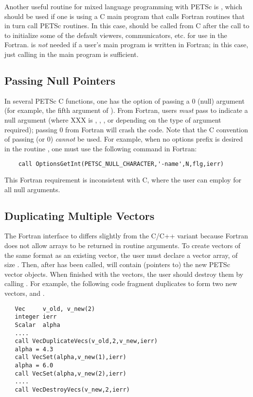 Another useful routine for mixed language programming with PETSc is
, which should be used if one is using a
C main program that calls Fortran routines that in turn call PETSc
routines.  In this case,  should be
called from C after the call to  to initialize
some of the default viewers, communicators, etc.  for use in the
Fortran.   is {\em not} needed if a
user's main program is written in Fortran; in this case, just calling
 in the main program is sufficient.

\subsection{Passing Null Pointers}

In several PETSc C functions, one has the option of passing a 0 (null)
argument (for example, the fifth argument of ).
From Fortran, users {\em must} pass  to indicate a
null argument (where XXX is , , ,
or  depending on the type of argument required); 
 passing  0 from 
 Fortran   will crash
the code.   Note
that the C convention of passing  (or 0) {\em cannot}
be used.  For example, when no options prefix is desired in the
routine , one must use the following command in
Fortran:
\begin{verbatim}
    call OptionsGetInt(PETSC_NULL_CHARACTER,'-name',N,flg,ierr)
\end{verbatim}

This Fortran requirement is inconsistent with C, where the 
user can employ  for all null arguments. 

\subsection{Duplicating Multiple Vectors}
\label{sec:fortvecd}

The Fortran interface to  differs slightly
from the C/C++ variant because Fortran does not allow arrays to be
returned in routine arguments.  To create  vectors of the same
format as an existing vector, the user must declare a vector array,
 of size .  Then, after  has
been called,  will contain (pointers to) the new PETSc
vector objects.  When finished with the vectors, the user should
destroy them by calling .
 For example, the following code fragment
duplicates  to form two new vectors,  and .
\begin{verbatim}
   Vec     v_old, v_new(2)
   integer ierr
   Scalar  alpha
   ....
   call VecDuplicateVecs(v_old,2,v_new,ierr)
   alpha = 4.3
   call VecSet(alpha,v_new(1),ierr)
   alpha = 6.0
   call VecSet(alpha,v_new(2),ierr)
   ....
   call VecDestroyVecs(v_new,2,ierr)
\end{verbatim}

